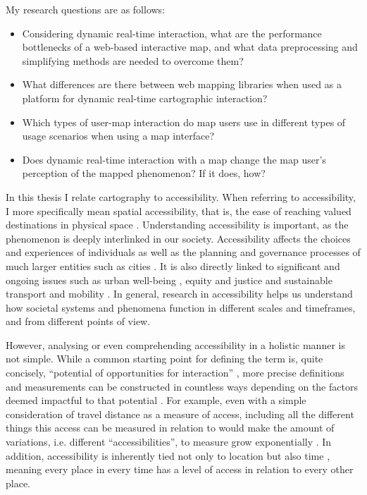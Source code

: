 My research questions are as follows:

\begin{itemize}
	\item Considering dynamic real-time interaction,
	what are the performance bottlenecks of
	a web-based interactive map,
	and what data preprocessing and simplifying methods
	are needed to overcome them?
	\item What differences are there between web mapping libraries
	when used as a platform for dynamic real-time cartographic interaction?
	\item Which types of user-map interaction do map users use
	in different types of usage scenarios when using a map interface?
	\item Does dynamic real-time interaction with a map change
	the map user's perception of the mapped phenomenon? If it does, how?
\end{itemize}

In this thesis I relate cartography to accessibility.
When referring to accessibility,
I more specifically mean spatial accessibility, that is,
the ease of reaching valued destinations in physical space \parencite{lev2020}.
Understanding accessibility is important,
as the phenomenon is deeply interlinked in our society.
Accessibility affects the choices and experiences of individuals \parencite{kwa1998, kwa2003}
as well as the planning and governance processes
of much larger entities such as cities \parencite{cur2010, low2015}.
It is also directly linked to significant and ongoing issues such as
urban well-being \parencite{zha2011},
equity and justice \parencite{per2017, che2020}
and sustainable transport and mobility \parencite{son2017, mah2019}.
In general, research in accessibility helps us understand
how societal systems and phenomena function
in different scales and timeframes, and from different points of view.

However, analysing or even comprehending accessibility
in a holistic manner is not simple.
While a common starting point for defining the term is, quite concisely,
\enquote{potential of opportunities for interaction} \parencite{han1959},  %
more precise definitions and measurements can be constructed in countless ways
depending on the factors deemed impactful to that potential
\parencite{pap2016}.
For example, even with a simple consideration of travel distance as a measure of access,
including all the different things this access can be measured in relation to
would make the amount of variations, i.e. different \enquote{accessibilities},
to measure grow exponentially \parencite{lev2020}.
In addition, accessibility is inherently tied not only to location
but also time \parencite{jar2018},
meaning every place in every time has a level of access
in relation to every other place.

